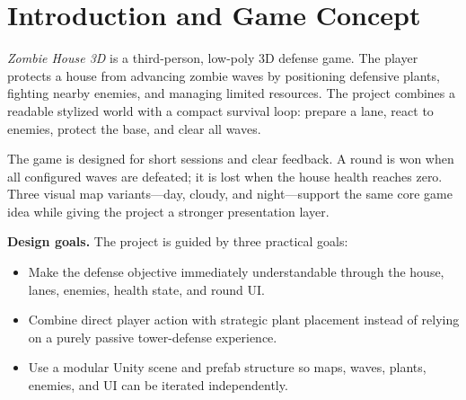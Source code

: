 \section{Introduction and Game Concept}

\textit{Zombie House 3D} is a third-person, low-poly 3D defense game. The player protects a house from advancing zombie waves by positioning defensive plants, fighting nearby enemies, and managing limited resources. The project combines a readable stylized world with a compact survival loop: prepare a lane, react to enemies, protect the base, and clear all waves.

The game is designed for short sessions and clear feedback. A round is won when all configured waves are defeated; it is lost when the house health reaches zero. Three visual map variants---day, cloudy, and night---support the same core game idea while giving the project a stronger presentation layer.

\textbf{Design goals.} The project is guided by three practical goals:
\begin{itemize}
  \item Make the defense objective immediately understandable through the house, lanes, enemies, health state, and round UI.
  \item Combine direct player action with strategic plant placement instead of relying on a purely passive tower-defense experience.
  \item Use a modular Unity scene and prefab structure so maps, waves, plants, enemies, and UI can be iterated independently.
\end{itemize}
